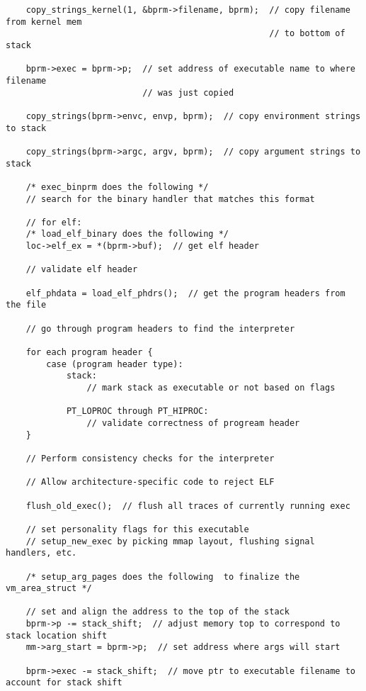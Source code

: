 \documentclass[a4paper]{article}
\begin{document}
{\begin{verbatim}
    copy_strings_kernel(1, &bprm->filename, bprm);  // copy filename from kernel mem 
                                                    // to bottom of stack
                                                 
    bprm->exec = bprm->p;  // set address of executable name to where filename
                           // was just copied
                           
    copy_strings(bprm->envc, envp, bprm);  // copy environment strings to stack
    
    copy_strings(bprm->argc, argv, bprm);  // copy argument strings to stack
    
    /* exec_binprm does the following */
    // search for the binary handler that matches this format
    
    // for elf:
    /* load_elf_binary does the following */
    loc->elf_ex = *(bprm->buf);  // get elf header
    
    // validate elf header
    
    elf_phdata = load_elf_phdrs();  // get the program headers from the file
    
    // go through program headers to find the interpreter
    
    for each program header {
        case (program header type):
            stack:
                // mark stack as executable or not based on flags
                
            PT_LOPROC through PT_HIPROC:
                // validate correctness of progream header
    } 
    
    // Perform consistency checks for the interpreter
    
    // Allow architecture-specific code to reject ELF
    
    flush_old_exec();  // flush all traces of currently running exec 
    
    // set personality flags for this executable
    // setup_new_exec by picking mmap layout, flushing signal handlers, etc.
    
    /* setup_arg_pages does the following  to finalize the vm_area_struct */
    
    // set and align the address to the top of the stack
    bprm->p -= stack_shift;  // adjust memory top to correspond to stack location shift
    mm->arg_start = bprm->p;  // set address where args will start
    
    bprm->exec -= stack_shift;  // move ptr to executable filename to account for stack shift
    

\end{verbatim}}
\end{document}
